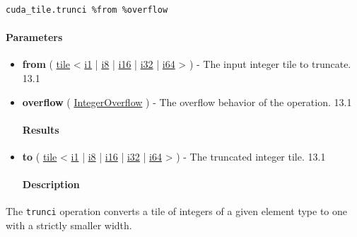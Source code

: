 \documentclass{article}
\begin{document}
\begin{lstlisting}
cuda_tile.trunci %from %overflow
\end{lstlisting}

\paragraph{Parameters}

\begin{itemize}
\item \textbf{from} ( \href{https://docs.nvidia.com/cuda/tile-ir/latest/sections/types.html#type-tile}{tile} < \href{https://docs.nvidia.com/cuda/tile-ir/latest/sections/types.html#subsection-element-types}{i1} | \href{https://docs.nvidia.com/cuda/tile-ir/latest/sections/types.html#subsection-element-types}{i8} | \href{https://docs.nvidia.com/cuda/tile-ir/latest/sections/types.html#subsection-element-types}{i16} | \href{https://docs.nvidia.com/cuda/tile-ir/latest/sections/types.html#subsection-element-types}{i32} | \href{https://docs.nvidia.com/cuda/tile-ir/latest/sections/types.html#subsection-element-types}{i64} > ) - The input integer tile to truncate. 13.1
\item \textbf{overflow} ( \href{https://docs.nvidia.com/cuda/tile-ir/latest/sections/operations.html#op-attribute-cuda-tile-trunci-integeroverflow-attr}{IntegerOverflow} ) - The overflow behavior of the operation. 13.1


\paragraph{Results}

\item \textbf{to} ( \href{https://docs.nvidia.com/cuda/tile-ir/latest/sections/types.html#type-tile}{tile} < \href{https://docs.nvidia.com/cuda/tile-ir/latest/sections/types.html#subsection-element-types}{i1} | \href{https://docs.nvidia.com/cuda/tile-ir/latest/sections/types.html#subsection-element-types}{i8} | \href{https://docs.nvidia.com/cuda/tile-ir/latest/sections/types.html#subsection-element-types}{i16} | \href{https://docs.nvidia.com/cuda/tile-ir/latest/sections/types.html#subsection-element-types}{i32} | \href{https://docs.nvidia.com/cuda/tile-ir/latest/sections/types.html#subsection-element-types}{i64} > ) - The truncated integer tile. 13.1


\paragraph{Description}

\end{itemize}
The \texttt{trunci} operation converts a tile of integers of a given element type to one with a strictly smaller width.
\end{document}
